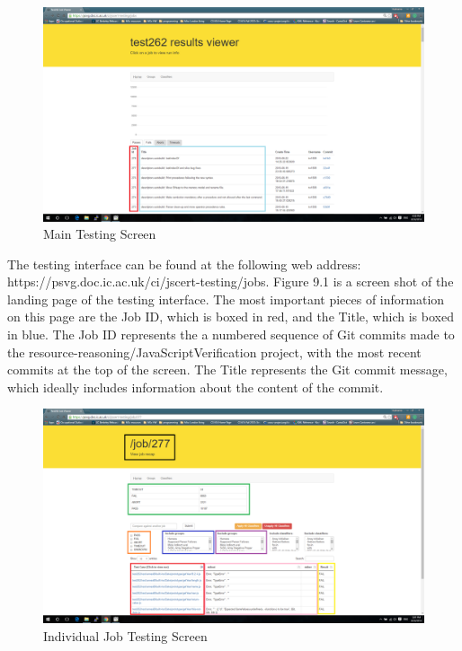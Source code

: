 \documentclass[a4paper,11pt,twoside]{report}
\begin{document}
\begin{figure}[h!]
  \caption{Main Testing Screen}
  \includegraphics[width=1.0\textwidth]{main_testing_screen_boxed}
\end{figure}

The testing interface can be found at the following web address: https://psvg.doc.ic.ac.uk/ci/jscert-testing/jobs. Figure 9.1 is a screen shot of the landing page of the testing interface. The most important pieces of information on this page are the Job ID, which is boxed in red, and the Title, which is boxed in blue. The Job ID represents the a numbered sequence of Git commits made to the resource-reasoning/JavaScriptVerification project, with the most recent commits at the top of the screen. The Title represents the Git commit message, which ideally includes information about the content of the commit.

\begin{figure}[h!]
  \caption{Individual Job Testing Screen}
  \includegraphics[width=1.0\textwidth]{job_testing_screen_boxed}
\end{figure}
\end{document}
